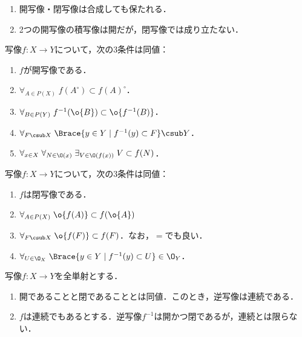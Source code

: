 \documentclass[uplatex,dvipdfmx]{jsreport}
\begin{document}
\begin{lemma}[合成と積に関する性質]\mbox{}
    \begin{enumerate}
        \item 開写像・閉写像は合成しても保たれる．
        \item 2つの開写像の積写像は開だが，閉写像では成り立たない．
    \end{enumerate}
\end{lemma}

\begin{proposition}[演算子による開写像の特徴付け]
    写像$f:X\to Y$について，次の3条件は同値：
    \begin{enumerate}
        \item $f$が開写像である．
        \item $\forall_{A\in P(X)}\;f(A^\circ)\subset f(A)^\circ$．
        \item $\forall_{B\in P(Y)}\;f^{-1}(\o{B})\subset\o{f^{-1}(B)}$．
        \item $\forall_{F\csub X}\;\Brace{y\in Y\mid f^{-1}(y)\subset F}\csub Y$．
        \item $\forall_{x\in X}\;\forall_{N\in\O(x)}\;\exists_{V\in\O(f(x))}\;V\subset f(N)$．
    \end{enumerate}
\end{proposition}

\begin{proposition}[演算子による閉写像の特徴付け]
    写像$f:X\to Y$について，次の3条件は同値：
    \begin{enumerate}
        \item $f$は閉写像である．
        \item $\forall_{A\in P(X)}\;\o{f(A)}\subset f(\o{A})$
        \item $\forall_{F\csub X}\;\o{f(F)}\subset f(F)$．なお，$=$でも良い．
        \item $\forall_{U\in\O_X}\;\Brace{y\in Y\mid f^{-1}(y)\subset U}\in\O_Y$．
    \end{enumerate}
\end{proposition}

\begin{proposition}[全単射な開写像]\label{prop-bijective-open-map}
    写像$f:X\to Y$を全単射とする．
    \begin{enumerate}
        \item 開であることと閉であることとは同値．このとき，逆写像は連続である．
        \item $f$は連続でもあるとする．逆写像$f^{-1}$は開かつ閉であるが，連続とは限らない．
    \end{enumerate}
\end{proposition}
\end{document}
